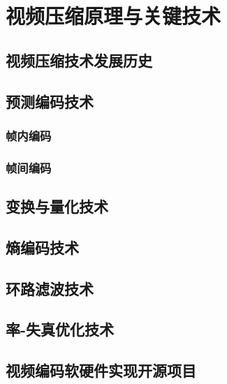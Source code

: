\chapter{视频压缩原理与关键技术}
\label{cha:c2}

\section{视频压缩技术发展历史}

\section{预测编码技术}
\subsection{帧内编码}
\subsection{帧间编码}

\section{变换与量化技术}

\section{熵编码技术}

\section{环路滤波技术}

\section{率-失真优化技术}

\section{视频编码软硬件实现开源项目}
